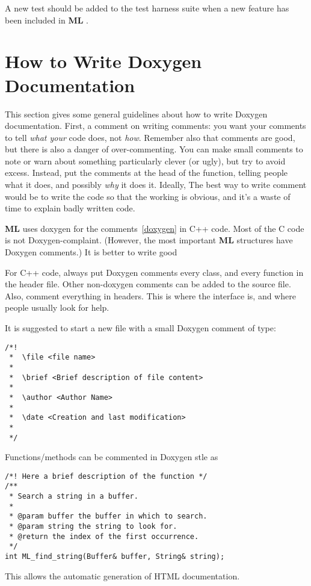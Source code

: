 \documentclass[10pt,letter,relax]{SANDreport}
\newcommand{\ML}     {{\bf ML }}
\begin{document}
A new test should be added to the test harness suite when a new feature
has been included in \ML. 


\section{How to Write Doxygen Documentation}
\label{sec:doxygen}

This section gives some general guidelines about how to write Doxygen
documentation.  First, a comment on writing comments: you want your comments
to tell {\sl what your} code does, not {\sl how}.  Remember also that comments
are good, but there is also a danger of over-commenting. You can make small
comments to note or warn about something particularly clever (or ugly), but
try to avoid excess.  Instead, put the comments at the head of the function,
telling people what it does, and possibly {\sl why} it does it.  Ideally,
The best way to write comment would be to write the code so that the working
is obvious, and it's a waste of time to explain badly written code.

\ML uses doxygen for the comments~\ref{doxygen} in C++ code. Most
  of the C code is not Doxygen-complaint. (However, the most important
  \ML structures have Doxygen comments.) It is better to write good

For C++ code, always put Doxygen comments every class, and every
  function in the header file.  Other non-doxygen comments can be added
  to the source file.
Also, comment everything in headers. This is where the
  interface is, and where people usually look for help.

It is suggested to start a new file with a small Doxygen comment of type:
\begin{verbatim}
/*!
 *  \file <file name>
 *
 *  \brief <Brief description of file content>
 *
 *  \author <Author Name>
 *
 *  \date <Creation and last modification>
 *
 */
\end{verbatim}

Functions/methods can be commented in Doxygen stle as
\begin{verbatim}
/*! Here a brief description of the function */
/**
 * Search a string in a buffer.
 *
 * @param buffer the buffer in which to search.
 * @param string the string to look for.
 * @return the index of the first occurrence.
 */
int ML_find_string(Buffer& buffer, String& string);
\end{verbatim}
This allows the automatic generation of HTML documentation. 
\end{document}
